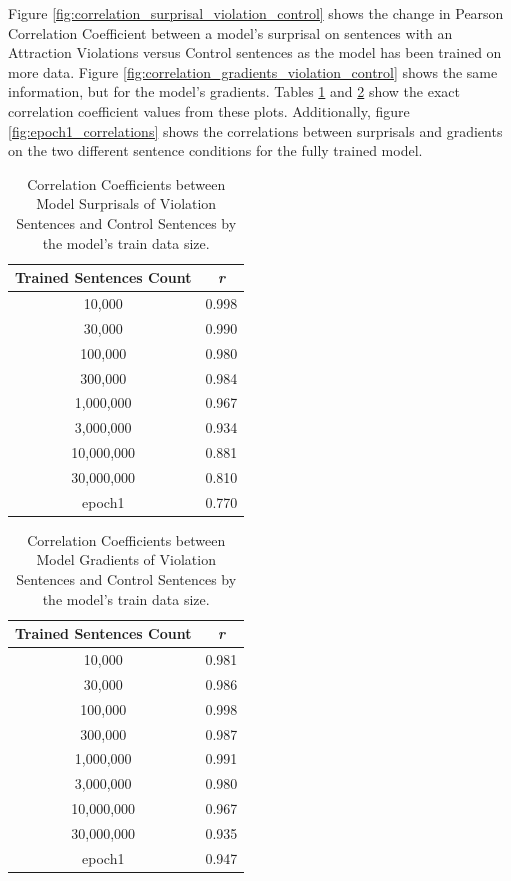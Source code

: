\documentclass{IEEEtran}
\begin{document}
Figure \ref{fig:correlation_surprisal_violation_control} shows the change in Pearson Correlation Coefficient between a model's surprisal on sentences with an Attraction Violations versus Control sentences as the model has been trained on more data.
Figure \ref{fig:correlation_gradients_violation_control} shows the same information, but for the model's gradients.
Tables \ref{tab:correlation_surprisal_violations_control} and \ref{tab:correlation_gradients_violations_control} show the exact correlation coefficient values from these plots.
Additionally, figure \ref{fig:epoch1_correlations} shows the correlations between surprisals and gradients on the two different sentence conditions for the fully trained model.

\begin{table}
    \centering
    \begin{tabular}{c|c}
        \textbf{Trained Sentences Count} & \textbf{\textit{r}} \\
        \hline
        10,000&0.998\\
        30,000&0.990\\
        100,000&0.980\\
        300,000&0.984\\
        1,000,000&0.967\\
        3,000,000&0.934\\
        10,000,000&0.881\\
        30,000,000&0.810\\
        epoch1&0.770
    \end{tabular}
    \caption{Correlation Coefficients between Model Surprisals of Violation Sentences and Control Sentences by the model's train data size.}
    \label{tab:correlation_surprisal_violations_control}
\end{table}
\begin{table}
    \centering
    \begin{tabular}{c|c}
        \textbf{Trained Sentences Count} & \textbf{\textit{r}} \\
        \hline
        10,000&0.981\\
        30,000&0.986\\
        100,000&0.998\\
        300,000&0.987\\
        1,000,000&0.991\\
        3,000,000&0.980\\
        10,000,000&0.967\\
        30,000,000&0.935\\
        epoch1&0.947
    \end{tabular}
    \caption{Correlation Coefficients between Model Gradients of Violation Sentences and Control Sentences by the model's train data size.}
    \label{tab:correlation_gradients_violations_control}
\end{table}
\end{document}
